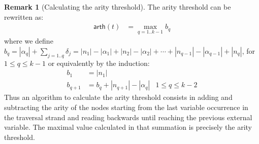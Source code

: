 \documentclass{article}
\theoremstyle{definition}
\newtheorem{remark}{Remark}[section]
\newcommand\arth{\textsf{arth}} %
\begin{document}
\begin{remark}[Calculating the arity threshold]
The arity threshold can be rewritten as:
\begin{align*}
\arth(t) &= \max_{q=1..k-1} b_q
\end{align*}
where we define $b_q = |\alpha_q| + \sum_{j=1..q} \delta_j = |n_1| - |\alpha_1| + |n_2| - |\alpha_2| + \cdots + |n_{q-1}| - |\alpha_{q-1}| + |n_q|$, for $1\leq q\leq k-1$ or equivalently by the induction:
 \begin{align*}
 b_1 &= |n_1| \\
 b_{q+1} &= b_q + |n_{q+1}| - |\alpha_q| & \mbox{$1 \leq q \leq k-2$}
 \end{align*}
Thus an algorithm to calculate the arity threshold consists in adding and subtracting the arity of the nodes starting from the last variable occurrence in the traversal strand and reading backwards until reaching the previous external variable. The maximal value calculated in that summation is precisely the arity threshold.
\end{remark}
\end{document}
